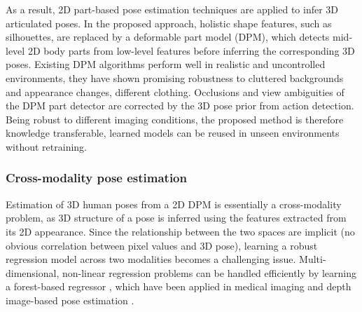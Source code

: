As a result, 2D part-based pose estimation techniques are applied to infer 3D articulated poses. In the proposed approach, holistic shape features, such as silhouettes, are replaced by a deformable part model (DPM), which detects mid-level 2D body parts from low-level features before inferring the corresponding 3D poses. Existing DPM algorithms perform well in realistic and uncontrolled environments, they have shown promising robustness to cluttered backgrounds and appearance changes, \eg different clothing. 
Occlusions and view ambiguities of the DPM part detector are corrected by the 3D pose prior from action detection. 
Being robust to different imaging conditions, the proposed method is therefore knowledge transferable, learned models can be reused in unseen environments without retraining. 

\subsubsection{Cross-modality pose estimation} 

Estimation of 3D human poses from a 2D DPM is essentially a cross-modality problem, as 3D structure of a pose is inferred using the features extracted from its 2D appearance. 
Since the relationship between the two spaces are implicit (no obvious correlation between pixel values and 3D pose), learning a robust regression model across two modalities becomes a challenging issue. 
Multi-dimensional, non-linear regression problems can be handled efficiently by learning a forest-based regressor \cite{Shotton2013}, which have been applied in medical imaging \cite{Criminisi2011} and depth image-based pose estimation \cite{Girshick2011}.  

